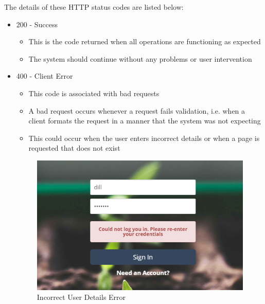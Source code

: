 \documentclass{article}
\begin{document}
	The details of these HTTP status codes are listed below:
	\begin{itemize}
		\item 200 - Success
			\begin{itemize}
				\item This is the code returned when all operations are functioning as expected
				\item The system should continue without any problems or user intervention
			\end{itemize}
		\item 400 - Client Error
			\begin{itemize}
				\item This code is associated with bad requests
				\item A bad request occurs whenever a request fails validation, i.e. when a client formats the request in a manner that the system was not expecting
				\item This could occur when the user enters incorrect details or when a page is requested that does not exist
			\end{itemize}
			\begin{figure}[H]
				\includegraphics[width=\textwidth]{../images/UserManual/400error.png}
				\caption{Incorrect User Details Error}
			\end{figure}
			
\cleardoublepage


\end{itemize}
\end{document}
